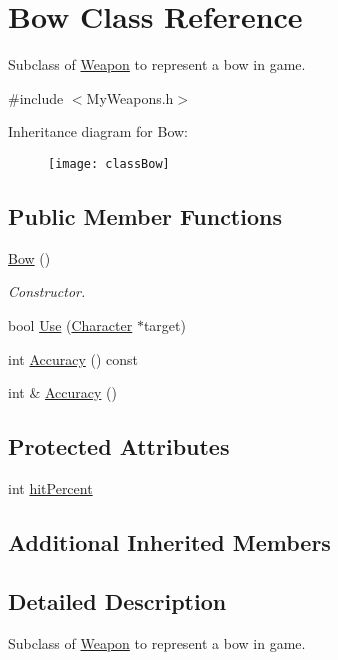 \hypertarget{classBow}{\section{Bow Class Reference}
\label{classBow}
}


Subclass of \hyperlink{classWeapon}{Weapon} to represent a bow in game.  




{\ttfamily \#include $<$My\-Weapons.\-h$>$}

Inheritance diagram for Bow\-:\begin{figure}[H]
\begin{center}
\leavevmode
\texttt{[image: classBow]}
\end{center}
\end{figure}
\subsection*{Public Member Functions}
\begin{DoxyCompactItemize}
\item 
\hyperlink{classBow_ae13f3721e07f62cacca7dc87e7cd3e09}{Bow} ()
\begin{DoxyCompactList}\small\item\em Constructor. \end{DoxyCompactList}\item 
bool \hyperlink{classBow_a07d98049b83e0f21ccbef29c7294bde7}{Use} (\hyperlink{classCharacter}{Character} $\ast$target)
\item 
int \hyperlink{classBow_a21dbb0783c1679385328d55b441c929d}{Accuracy} () const 
\item 
int \& \hyperlink{classBow_a52c352696cee03880097e8b28811e204}{Accuracy} ()
\end{DoxyCompactItemize}
\subsection*{Protected Attributes}
\begin{DoxyCompactItemize}
\item 
int \hyperlink{classBow_ab6156932e51ec7833d07a669e5e346ff}{hit\-Percent}
\end{DoxyCompactItemize}
\subsection*{Additional Inherited Members}


\subsection{Detailed Description}
Subclass of \hyperlink{classWeapon}{Weapon} to represent a bow in game. 

